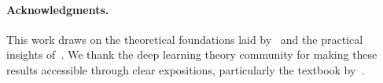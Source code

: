 \documentclass[10pt]{article}
\theoremstyle{definition}
\begin{document}
\paragraph{Acknowledgments.}
This work draws on the theoretical foundations laid by~\citet{schoenholz2017deep,poole2016exponential,jacot2018neural} and the practical insights of~\citet{he2015delving,glorot2010understanding,saxe2014exact}.
We thank the deep learning theory community for making these results accessible through clear expositions, particularly the textbook by~\citet{roberts2022principles}.

\begingroup
\renewcommand{\section}[2]{}
\end{document}
